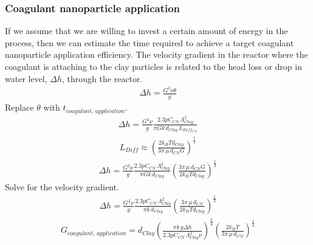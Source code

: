 \documentclass[letterpaper,10pt,english]{sphinxmanual}
\begin{document}
\subsubsection{Coagulant nanoparticle application}
\label{\detokenize{Rapid_Mix/RM_Theory_and_Future_Work:coagulant-nanoparticle-application}}
If we assume that we are willing to invest a certain amount of energy in the process, then we can estimate the time required to achieve a target coagulant nanoparticle application efficiency. The velocity gradient in the reactor where the coagulant is attaching to the clay particles is related to the head loss or drop in water level, \(\Delta h\), through the reactor.
\begin{equation}\label{equation:Rapid_Mix/RM_Theory_and_Future_Work:Rapid_Mix/RM_Theory_and_Future_Work:17}
\begin{split}\Delta h =   \frac{G^2 \nu \theta}{g}\end{split}
\end{equation}
Replace \(\theta\) with \(t_{coagulant, \, application}\).
\begin{equation}\label{equation:Rapid_Mix/RM_Theory_and_Future_Work:Rapid_Mix/RM_Theory_and_Future_Work:18}
\begin{split}\Delta h =  \frac{G^2 \nu}{g} \frac{2.3p C_{CN} \, \Lambda_{Clay}^2}{\pi G k \, d_{Clay}\,  L_{Diff_{CN}} }\end{split}
\end{equation}\begin{equation}\label{equation:Rapid_Mix/RM_Theory_and_Future_Work:Rapid_Mix/RM_Theory_and_Future_Work:19}
\begin{split}L_{Diff} \approx \left( \frac{2k_B T d_{Clay}}{3 \pi \,\mu  \, d_{CN} G}\right)^\frac{1}{3}\end{split}
\end{equation}\begin{equation}\label{equation:Rapid_Mix/RM_Theory_and_Future_Work:Rapid_Mix/RM_Theory_and_Future_Work:20}
\begin{split}\Delta h =  \frac{G^2 \nu}{g} \frac{2.3p C_{CN} \, \Lambda_{Clay}^2}{\pi G k \, d_{Clay}} \left( \frac{3 \pi \,\mu  \, d_{CN} G}{2k_B T d_{Clay}}\right)^\frac{1}{3}\end{split}
\end{equation}
Solve for the velocity gradient.
\begin{equation}\label{equation:Rapid_Mix/RM_Theory_and_Future_Work:Rapid_Mix/RM_Theory_and_Future_Work:21}
\begin{split}\Delta h =  \frac{G^\frac{4}{3} \nu}{g} \frac{2.3p C_{CN} \, \Lambda_{Clay}^2}{\pi k \, d_{Clay}} \left( \frac{3 \pi \,\mu  \, d_{CN} }{2k_B T d_{Clay}}\right)^\frac{1}{3}\end{split}
\end{equation}\begin{equation}\label{equation:Rapid_Mix/RM_Theory_and_Future_Work:Rapid_Mix/RM_Theory_and_Future_Work:22}
\begin{split}G_{coagulant, \, application} =  d_{Clay}\left(\frac{\pi k \,g\Delta h }{2.3p C_{CN} \, \Lambda_{Clay}^2 \nu} \right)^\frac{3}{4} \left( \frac{2k_B T }{3 \pi \,\mu  \, d_{CN} }\right)^\frac{1}{4}\end{split}
\end{equation}
\end{document}
